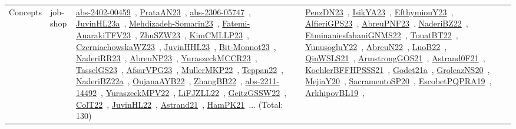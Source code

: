 {\begin{longtable}{lp{3cm}>{\raggedright\arraybackslash}p{6cm}>{\raggedright\arraybackslash}p{6cm}>{\raggedright\arraybackslash}p{8cm}}
Concepts & job-shop & \href{works/abs-2402-00459.pdf}{abs-2402-00459}~\cite{abs-2402-00459}, \href{works/PrataAN23.pdf}{PrataAN23}~\cite{PrataAN23}, \href{works/abs-2306-05747.pdf}{abs-2306-05747}~\cite{abs-2306-05747}, \href{works/JuvinHL23a.pdf}{JuvinHL23a}~\cite{JuvinHL23a}, \href{works/Mehdizadeh-Somarin23.pdf}{Mehdizadeh-Somarin23}~\cite{Mehdizadeh-Somarin23}, \href{works/Fatemi-AnarakiTFV23.pdf}{Fatemi-AnarakiTFV23}~\cite{Fatemi-AnarakiTFV23}, \href{works/ZhuSZW23.pdf}{ZhuSZW23}~\cite{ZhuSZW23}, \href{works/KimCMLLP23.pdf}{KimCMLLP23}~\cite{KimCMLLP23}, \href{works/CzerniachowskaWZ23.pdf}{CzerniachowskaWZ23}~\cite{CzerniachowskaWZ23}, \href{works/JuvinHHL23.pdf}{JuvinHHL23}~\cite{JuvinHHL23}, \href{works/Bit-Monnot23.pdf}{Bit-Monnot23}~\cite{Bit-Monnot23}, \href{works/NaderiRR23.pdf}{NaderiRR23}~\cite{NaderiRR23}, \href{works/AbreuNP23.pdf}{AbreuNP23}~\cite{AbreuNP23}, \href{works/YuraszeckMCCR23.pdf}{YuraszeckMCCR23}~\cite{YuraszeckMCCR23}, \href{works/TasselGS23.pdf}{TasselGS23}~\cite{TasselGS23}, \href{works/AfsarVPG23.pdf}{AfsarVPG23}~\cite{AfsarVPG23}, \href{works/MullerMKP22.pdf}{MullerMKP22}~\cite{MullerMKP22}, \href{works/Teppan22.pdf}{Teppan22}~\cite{Teppan22}, \href{works/NaderiBZ22a.pdf}{NaderiBZ22a}~\cite{NaderiBZ22a}, \href{works/OujanaAYB22.pdf}{OujanaAYB22}~\cite{OujanaAYB22}, \href{works/ZhangBB22.pdf}{ZhangBB22}~\cite{ZhangBB22}, \href{works/abs-2211-14492.pdf}{abs-2211-14492}~\cite{abs-2211-14492}, \href{works/YuraszeckMPV22.pdf}{YuraszeckMPV22}~\cite{YuraszeckMPV22}, \href{works/LiFJZLL22.pdf}{LiFJZLL22}~\cite{LiFJZLL22}, \href{works/GeitzGSSW22.pdf}{GeitzGSSW22}~\cite{GeitzGSSW22}, \href{works/ColT22.pdf}{ColT22}~\cite{ColT22}, \href{works/JuvinHL22.pdf}{JuvinHL22}~\cite{JuvinHL22}, \href{works/Astrand21.pdf}{Astrand21}~\cite{Astrand21}, \href{works/HamPK21.pdf}{HamPK21}~\cite{HamPK21}... (Total: 130) & \href{works/PenzDN23.pdf}{PenzDN23}~\cite{PenzDN23}, \href{works/IsikYA23.pdf}{IsikYA23}~\cite{IsikYA23}, \href{works/EfthymiouY23.pdf}{EfthymiouY23}~\cite{EfthymiouY23}, \href{works/AlfieriGPS23.pdf}{AlfieriGPS23}~\cite{AlfieriGPS23}, \href{works/AbreuPNF23.pdf}{AbreuPNF23}~\cite{AbreuPNF23}, \href{works/NaderiBZ22.pdf}{NaderiBZ22}~\cite{NaderiBZ22}, \href{works/EtminaniesfahaniGNMS22.pdf}{EtminaniesfahaniGNMS22}~\cite{EtminaniesfahaniGNMS22}, \href{works/TouatBT22.pdf}{TouatBT22}~\cite{TouatBT22}, \href{works/YunusogluY22.pdf}{YunusogluY22}~\cite{YunusogluY22}, \href{works/AbreuN22.pdf}{AbreuN22}~\cite{AbreuN22}, \href{works/LuoB22.pdf}{LuoB22}~\cite{LuoB22}, \href{works/QinWSLS21.pdf}{QinWSLS21}~\cite{QinWSLS21}, \href{works/ArmstrongGOS21.pdf}{ArmstrongGOS21}~\cite{ArmstrongGOS21}, \href{works/Astrand0F21.pdf}{Astrand0F21}~\cite{Astrand0F21}, \href{works/KoehlerBFFHPSSS21.pdf}{KoehlerBFFHPSSS21}~\cite{KoehlerBFFHPSSS21}, \href{works/Godet21a.pdf}{Godet21a}~\cite{Godet21a}, \href{works/GroleazNS20.pdf}{GroleazNS20}~\cite{GroleazNS20}, \href{works/MejiaY20.pdf}{MejiaY20}~\cite{MejiaY20}, \href{works/SacramentoSP20.pdf}{SacramentoSP20}~\cite{SacramentoSP20}, \href{works/EscobetPQPRA19.pdf}{EscobetPQPRA19}~\cite{EscobetPQPRA19}, \href{works/ArkhipovBL19.pdf}{ArkhipovBL19}~\cite{ArkhipovBL19}, 
\end{longtable}}
